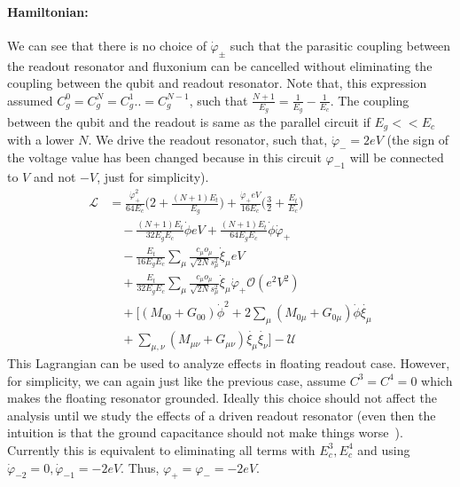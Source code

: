 \documentclass[prx,showpacs,notitlepage,twocolumn,superscriptaddress,nofootinbib,preprintnumbers,floatfix]{revtex4-2}
\newcommand{\sh}[1]{{\color{orange}{{}[SS: #1]}}}%
\begin{document}
\paragraph{Hamiltonian:} We can see that there is no choice of $\dot{\varphi}_{\pm}$ such that the parasitic coupling between the readout resonator and fluxonium can be cancelled without eliminating the coupling between the qubit and readout resonator. Note that, this expression assumed $C_g^0=C_g^N=C_g^1..=C_g^{N-1}$, such that  $\frac{N+1}{E_g}=\frac{1}{E_g}-\frac{1}{E_c}$. The coupling between the qubit and the readout is same as the parallel circuit if $E_g<<E_c$ with a lower $N$. We drive the readout resonator, such that, $\dot{\varphi}_{-}=2eV$ (the sign of the voltage value has been changed because in this circuit $\varphi_{-1}$ will be connected to $V$ and not $-V$, just for simplicity).\sh{Check the sign of the eV terms}
\begin{align}
    \mathcal{L}&=\frac{\dot{\varphi}_{+}^2}{64E_c}\Big(2+\frac{(N+1)E_t}{E_g}\Big)+\frac{\dot{\varphi}_{+}eV}{16E_c}\Big(\frac{3}{2}+\frac{E_t}{E_c}\Big)\nonumber\\
    &\quad-\frac{(N+1)E_t}{32E_gE_c}\dot{\phi}eV+\frac{(N+1)E_t}{64E_gE_c}\dot{\phi}\dot{\varphi}_{+}\nonumber\\
    &\quad -\frac{E_t}{16E_gE_c} \sum_\mu\frac{c_\mu o_\mu}{\sqrt{2N}s_\mu^2}  \dot{\xi}_\mu eV\nonumber\\
    &\quad+\frac{E_t}{32E_gE_c} \sum_\mu\frac{c_\mu o_\mu}{\sqrt{2N}s_\mu^2}  \dot{\xi}_\mu\dot{\varphi}_{+}\mathcal{O}(e^2V^2)\nonumber\\
    &\quad+\Big[(M_{00}+G_{00})\dot{\phi}^2+2\sum_{\mu}(M_{0\mu}+G_{0\mu})\dot{\phi}\dot{\xi_\mu}\nonumber\\
    &\quad+\sum_{\mu,\nu}(M_{\mu\nu}+G_{\mu\nu})\dot{\xi_\mu}\dot{\xi_\nu}\Big]-\mathcal{U}
\end{align}
This Lagrangian can be used to analyze effects in floating readout case. However, for simplicity, we can again just like the previous case, assume $C^3=C^4=0$ which makes the floating resonator grounded. Ideally this choice should not affect the analysis until we study the effects of a driven readout resonator (even then the intuition is that the ground capacitance should not make things worse~\sh{Check this intuition when analyzing a driven resonator. Also, we can check if changing $C_g^N=E_C^2=E+C^1$ brings the effect of Floating resonator closer to a parallel circuit. It will never be similar because we have one less ground capacitance term here.}). Currently this is equivalent to eliminating all terms with $E_c^3, E_c^4$ and using $\dot \varphi_{-2}=0, \dot\varphi_{-1}=-2eV$. Thus, $\varphi_{+}=\varphi_{-}=-2eV$. 
\end{document}
